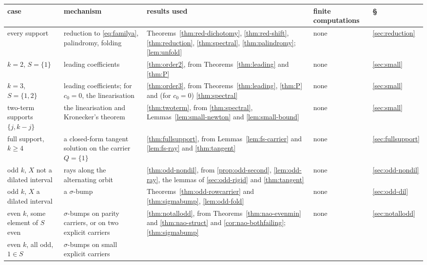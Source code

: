 \begin{table}
\centering
\footnotesize
\renewcommand{\arraystretch}{1.15}
\begin{tabular}{@{}>{\raggedright\arraybackslash}p{}%
>{\raggedright\arraybackslash}p{}%
>{\raggedright\arraybackslash}p{}%
>{\raggedright\arraybackslash}p{}%
>{\raggedright\arraybackslash}p{}@{}}
case & mechanism & results used & finite computations & \S\\\hline
every support & reduction to \eqref{eq:familya}, palindromy, folding &
Theorems~\ref{thm:red-dichotomy}, \ref{thm:red-shift},
\ref{thm:reduction}, \ref{thm:spectral}, \ref{thm:palindromy};
\autoref{lem:unfold} & none & \ref{sec:reduction}\\
$k=2$, $S=\{1\}$ & leading coefficients & \autoref{thm:order2}, from
Theorems~\ref{thm:leading} and \ref{thm:P} & none & \ref{sec:small}\\
$k=3$, $S=\{1,2\}$ & leading coefficients; for $c_0=0$, the linearisation &
\autoref{thm:order3}, from Theorems~\ref{thm:leading}, \ref{thm:P} and (for
$c_0=0$) \ref{thm:spectral} & none & \ref{sec:small}\\
two-term supports $\{j,k-j\}$ & the linearisation and Kronecker's theorem &
\autoref{thm:twoterm}, from \autoref{thm:spectral},
Lemmas~\ref{lem:small-newton} and \ref{lem:small-bound} & none &
\ref{sec:small}\\
full support, $k\ge4$ & a closed-form tangent solution on the carrier
$Q=\{1\}$ & \autoref{thm:fullsupport}, from Lemmas~\ref{lem:fs-carrier}
and \ref{lem:fs-ray} and \autoref{thm:tangent} & none &
\ref{sec:fullsupport}\\
odd $k$, $X$ not a dilated interval & rays along the alternating orbit &
\autoref{thm:odd-nondil}, from \autoref{prop:odd-second},
\autoref{lem:odd-ray}, the lemmas of \autoref{sec:odd-rigid} and
\autoref{thm:tangent} & none & \ref{sec:odd-nondil}\\
odd $k$, $X$ a dilated interval & a $\sigma$-bump &
Theorems~\ref{thm:odd-rowcarrier} and \ref{thm:sigmabump},
\autoref{lem:odd-fold} & none & \ref{sec:odd-dil}\\
even $k$, some element of $S$ even & $\sigma$-bumps on parity carriers, or
on two explicit carriers & \autoref{thm:notallodd}, from
Theorems~\ref{thm:nao-evenmin} and \ref{thm:nao-struct} and
\autoref{cor:nao-bothfailing}; \autoref{thm:sigmabump} & none &
\ref{sec:notallodd}\\
even $k$, all odd, $1\in S$ & $\sigma$-bumps on small explicit carriers &

\end{tabular}
\end{table}
